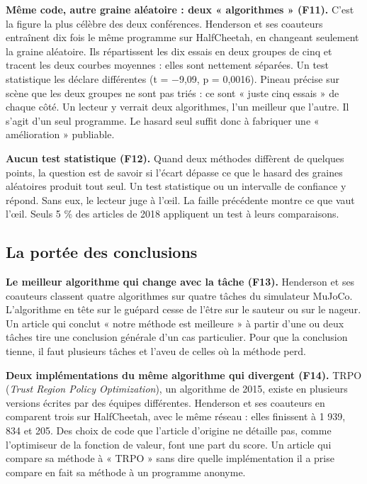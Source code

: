 \documentclass[11pt,a4paper]{article}
\begin{document}
\textbf{Même code, autre graine aléatoire : deux « algorithmes » (F11).}
C'est la figure la plus célèbre des deux conférences. Henderson et ses
coauteurs entraînent dix fois le même programme sur HalfCheetah, en
changeant seulement la graine aléatoire. Ils répartissent les dix essais
en deux groupes de cinq et tracent les deux courbes moyennes : elles
sont nettement séparées. Un test statistique les déclare différentes (t
= −9,09, p = 0,0016). Pineau précise sur scène que les deux groupes ne
sont pas triés : ce sont « juste cinq essais » de chaque côté. Un
lecteur y verrait deux algorithmes, l'un meilleur que l'autre. Il s'agit
d'un seul programme. Le hasard seul suffit donc à fabriquer une «
amélioration » publiable.

\textbf{Aucun test statistique (F12).} Quand deux méthodes diffèrent de
quelques points, la question est de savoir si l'écart dépasse ce que le
hasard des graines aléatoires produit tout seul. Un test statistique ou
un intervalle de confiance y répond. Sans eux, le lecteur juge à l'œil.
La faille précédente montre ce que vaut l'œil. Seuls 5 \% des articles
de 2018 appliquent un test à leurs comparaisons.

\subsection{La portée des
conclusions}\label{la-portuxe9e-des-conclusions}

\textbf{Le meilleur algorithme qui change avec la tâche (F13).}
Henderson et ses coauteurs classent quatre algorithmes sur quatre tâches
du simulateur MuJoCo. L'algorithme en tête sur le guépard cesse de
l'être sur le sauteur ou sur le nageur. Un article qui conclut « notre
méthode est meilleure » à partir d'une ou deux tâches tire une
conclusion générale d'un cas particulier. Pour que la conclusion tienne,
il faut plusieurs tâches et l'aveu de celles où la méthode perd.

\textbf{Deux implémentations du même algorithme qui divergent (F14).}
TRPO (\emph{Trust Region Policy Optimization}), un algorithme de 2015,
existe en plusieurs versions écrites par des équipes différentes.
Henderson et ses coauteurs en comparent trois sur HalfCheetah, avec le
même réseau : elles finissent à 1 939, 834 et 205. Des choix de code que
l'article d'origine ne détaille pas, comme l'optimiseur de la fonction
de valeur, font une part du score. Un article qui compare sa méthode à «
TRPO » sans dire quelle implémentation il a prise compare en fait sa
méthode à un programme anonyme.
\end{document}
